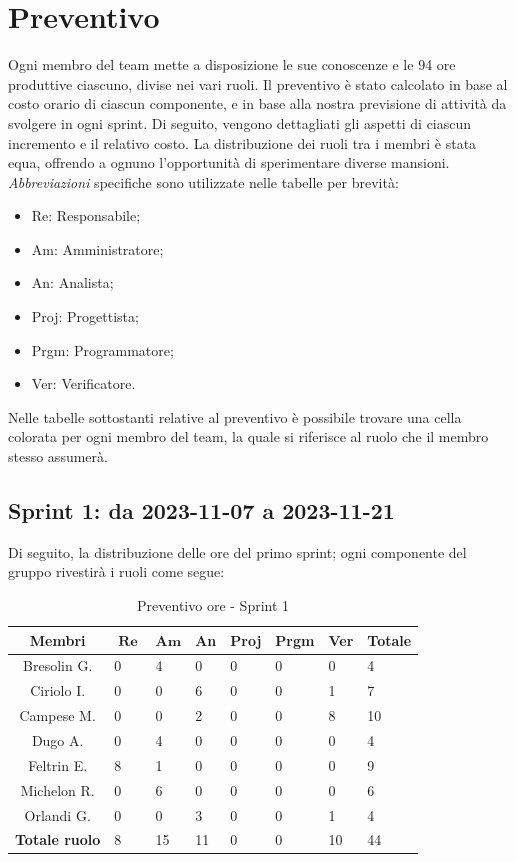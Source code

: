 \documentclass[10pt, a4paper]{article}
\begin{document}
\section{Preventivo}
Ogni membro del team mette a disposizione le sue conoscenze e le 94 ore produttive ciascuno, divise nei vari ruoli. Il preventivo è stato calcolato in base al costo orario di ciascun componente, e in base alla nostra previsione di attività da svolgere in ogni sprint. Di seguito, vengono dettagliati gli aspetti di ciascun incremento e il relativo costo. La distribuzione dei ruoli tra i membri è stata equa, offrendo a ognuno l'opportunità di sperimentare diverse mansioni. \textit{Abbreviazioni\pg} specifiche sono utilizzate nelle tabelle per brevità:
\begin{itemize}
    \item Re: Responsabile;
    \item Am: Amministratore;
    \item An: Analista;
    \item Proj: Progettista;
    \item Prgm: Programmatore;
    \item Ver: Verificatore.
\end{itemize}
Nelle tabelle sottostanti relative al preventivo è possibile trovare una cella colorata per ogni membro del team, la quale si riferisce al ruolo che il membro stesso assumerà.
\subsection{Sprint 1: da 2023-11-07 a 2023-11-21}

Di seguito, la distribuzione delle ore del primo sprint; ogni componente del gruppo rivestirà i ruoli come segue:
\begin{table}[H]
\begin{tabularx}{\textwidth}{c|X|X|X|X|X|X|X}
        \textbf{Membri} & $\operatorname{\textbf{Re}}$ & $\mathrm{\textbf{Am}}$ & \textbf{An} & \textbf{Proj} & \textbf{Prgm} & \textbf{Ver} & \textbf{Totale} \\
        \hline Bresolin G. & 0 & \cellcolor{primarycolor}4 & 0 & 0 & 0 & 0 & 4 \\
        \hline Ciriolo I.  & 0 & 0 & \cellcolor{primarycolor}6 & 0 & 0 & 1 & 7 \\
        \hline Campese M.  & 0 & 0 & 2 & 0 & 0 & \cellcolor{primarycolor}8 & 10 \\
        \hline Dugo A.     & 0 & \cellcolor{primarycolor}4 & 0 & 0 & 0 & 0 & 4 \\
        \hline Feltrin E.  & \cellcolor{primarycolor}8 & 1 & 0 & 0 & 0 & 0 & 9 \\
        \hline Michelon R. & 0 & \cellcolor{primarycolor}6 & 0 & 0 & 0 & 0 & 6 \\
        \hline Orlandi G.  & 0 & 0 & \cellcolor{primarycolor}3 & 0 & 0 & 1 & 4 \\
        \hline
        \textbf{Totale ruolo} & 8 & 15 & 11 & 0 & 0 & 10 & 44 
    \end{tabularx}
    \caption{Preventivo ore - Sprint 1}
    \end{table}
\end{document}
